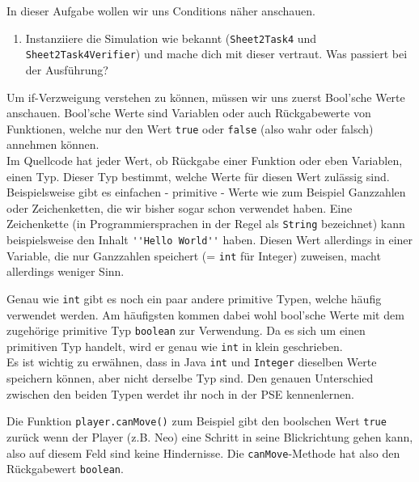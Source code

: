 

In dieser Aufgabe wollen wir uns Conditions näher anschauen.

\begin{enumerate}                           
    \item Instanziiere die Simulation wie bekannt (\lstinline{Sheet2Task4} und \lstinline{Sheet2Task4Verifier}) und mache dich mit dieser vertraut.
        Was passiert bei der Ausführung?
\end{enumerate}

\begin{Infobox}
    Um if-Verzweigung verstehen zu können, müssen wir uns zuerst Bool'sche Werte anschauen. Bool'sche Werte sind Variablen oder auch Rückgabewerte von Funktionen, welche nur den Wert \lstinline{true} oder \lstinline{false} (also wahr oder falsch) annehmen können. \\
    Im Quellcode hat jeder Wert, ob Rückgabe einer Funktion oder eben Variablen, einen Typ.
    Dieser Typ bestimmt, welche Werte für diesen Wert zulässig sind.
    Beispielsweise gibt es einfachen - primitive - Werte wie zum Beispiel Ganzzahlen oder Zeichenketten, die wir bisher sogar schon verwendet haben.
    Eine Zeichenkette (in Programmiersprachen in der Regel als \lstinline{String} bezeichnet) kann beispielsweise den Inhalt \lstinline{''Hello World''} haben.
    Diesen Wert allerdings in einer Variable, die nur Ganzzahlen speichert (= \lstinline{int} für Integer) zuweisen, macht allerdings weniger Sinn.
    
    Genau wie \lstinline{int} gibt es noch ein paar andere primitive Typen, welche häufig verwendet werden.
    Am häufigsten kommen dabei wohl bool'sche Werte mit dem zugehörige primitive Typ \lstinline{boolean} zur Verwendung.
    Da es sich um einen primitiven Typ handelt, wird er genau wie \lstinline{int} in klein geschrieben.\\
    
    Es ist wichtig zu erwähnen, dass in Java \lstinline{int} und \lstinline{Integer} dieselben Werte speichern können, aber nicht derselbe Typ sind.
    Den genauen Unterschied zwischen den beiden Typen werdet ihr noch in der PSE kennenlernen.
    
    Die Funktion \lstinline{player.canMove()} zum Beispiel gibt den boolschen Wert \lstinline{true} zurück wenn der Player (z.B. Neo) eine Schritt in seine Blickrichtung gehen kann, also auf diesem Feld sind keine Hindernisse.
    Die \lstinline{canMove}-Methode hat also den Rückgabewert \lstinline{boolean}.
    
\end{Infobox}

